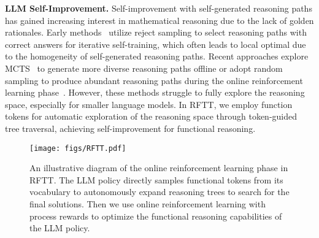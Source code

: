 \textbf{LLM Self-Improvement.}
Self-improvement with self-generated reasoning paths has gained increasing interest in mathematical reasoning due to the lack of golden rationales. Early methods~\citep{yuan2023scaling,zelikman2022star} utilize reject sampling to select reasoning paths with correct answers for iterative self-training, which often leads to local optimal due to the homogeneity of self-generated reasoning paths. Recent approaches explore MCTS~\citep{zhang2024rest,tian2024toward,hao2023reasoninglanguagemodelplanning,zhang2024accessing} to generate more diverse reasoning paths offline or adopt random sampling to produce abundant reasoning paths during the online reinforcement learning phase~\citep{reft2024,wang2024math,lambert2024t}. However, these methods struggle to fully explore the reasoning space, especially for smaller language models. In RFTT, we employ function tokens for automatic exploration of the reasoning space through token-guided tree traversal, achieving self-improvement for functional reasoning.


\begin{figure*}[t]
    \centering
    \texttt{[image: figs/RFTT.pdf]}
    \vspace{-18pt}
    \caption{An illustrative diagram of the online reinforcement learning phase in RFTT. The LLM policy directly samples functional tokens from its vocabulary to autonomously expand reasoning trees to search for the final solutions. Then we use online reinforcement learning with process rewards to optimize the functional reasoning capabilities of the LLM policy.
    }
    \label{fig:rftt}
    \vspace{-8pt}
\end{figure*}